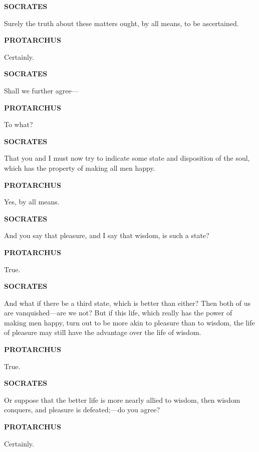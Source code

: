 \documentclass[11pt,letter]{article}
\begin{document}
\par \textbf{SOCRATES}
\par   Surely the truth about these matters ought, by all means, to be ascertained.

\par \textbf{PROTARCHUS}
\par   Certainly.

\par \textbf{SOCRATES}
\par   Shall we further agree—

\par \textbf{PROTARCHUS}
\par   To what?

\par \textbf{SOCRATES}
\par   That you and I must now try to indicate some state and disposition of the soul, which has the property of making all men happy.

\par \textbf{PROTARCHUS}
\par   Yes, by all means.

\par \textbf{SOCRATES}
\par   And you say that pleasure, and I say that wisdom, is such a state?

\par \textbf{PROTARCHUS}
\par   True.

\par \textbf{SOCRATES}
\par   And what if there be a third state, which is better than either? Then both of us are vanquished—are we not? But if this life, which really has the power of making men happy, turn out to be more akin to pleasure than to wisdom, the life of pleasure may still have the advantage over the life of wisdom.

\par \textbf{PROTARCHUS}
\par   True.

\par \textbf{SOCRATES}
\par   Or suppose that the better life is more nearly allied to wisdom, then wisdom conquers, and pleasure is defeated;—do you agree?

\par \textbf{PROTARCHUS}
\par   Certainly.
\end{document}
